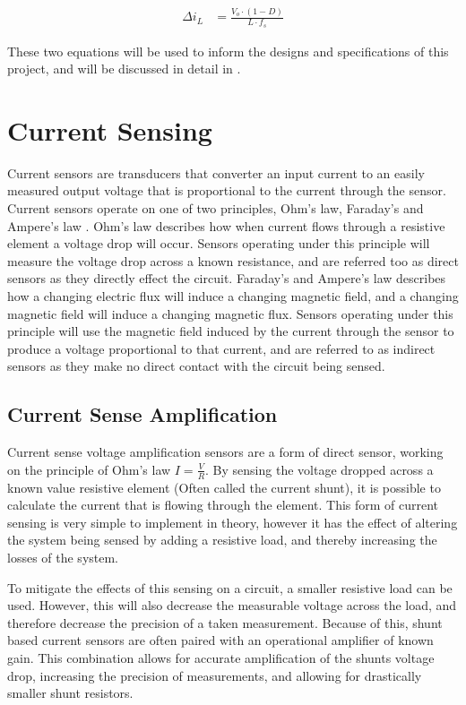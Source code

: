 \begin{align}\label{E:delta_i}
   \Delta i_L &= \frac{ V_{o} \cdot \left( 1 - D \right) } {L \cdot f_s}
\end{align}

These two equations will be used to inform the designs and specifications of this project, and will be discussed in detail in .




\section{Current Sensing}\label{S:current_sense_back}

Current sensors are transducers that converter an input current to an easily measured output voltage that is proportional to the current through the sensor. Current sensors operate on one of two principles, Ohm's law, Faraday’s and Ampere’s law \cite{current_sensor_types}.  Ohm's law describes how when current flows through a resistive element a voltage drop will occur. Sensors operating under this principle will measure the voltage drop across a known resistance, and are referred too as direct sensors as they directly effect the circuit. Faraday’s and Ampere’s law describes how a changing electric flux will induce a changing magnetic field, and a changing magnetic field will induce a changing magnetic flux. Sensors operating under this principle will use the magnetic field induced by the current through the sensor to produce a voltage proportional to that current, and are referred to as indirect sensors as they make no direct contact with the circuit being sensed. 


\subsection{Current Sense Amplification}\label{S:current_shunt_back}

Current sense voltage amplification sensors are a form of direct sensor, working on the principle of Ohm's law $I=\frac{V}{R}$. By sensing the voltage dropped across a known value resistive element (Often called the current shunt), it is possible to calculate the current that is flowing through the element. This form of current sensing is very simple to implement in theory, however it has the effect of altering the system being sensed by adding a resistive load, and thereby increasing the losses of the system. 

To mitigate the effects of this sensing on a circuit, a smaller resistive load can be used. However, this will also decrease the measurable voltage across the load, and therefore decrease the precision of a taken measurement. Because of this, shunt based current sensors are often paired with an operational amplifier of known gain. This combination allows for accurate amplification of the shunts voltage drop, increasing the precision of measurements, and allowing for drastically smaller shunt resistors. 


